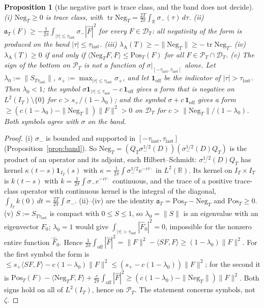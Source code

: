 \documentclass[11pt]{amsart}
\newtheorem{proposition}[theorem]{Proposition}
\theoremstyle{definition}
\theoremstyle{remark}
\newcommand{\R}{\mathbb R}
\newcommand{\PT}{\mathcal P_T}
\newcommand{\IT}{I_T}
\newcommand{\lamA}{\lambda_{\mathrm A}(T)}
\newcommand{\Fh}{\widehat F}
\begin{document}
\begin{proposition}[the negative part is trace class, and the band does not decide]\label{prop:negtrace}
\emph{(i)} $\mathrm{Neg}_T\ge0$ is trace class, with $\operatorname{tr}\mathrm{Neg}_T=\frac{2T}{2\pi}\int_\R\sigma_-(\tau)\,d\tau$.
\emph{(ii)} $\mathfrak a_T(F)\ge-\frac1{2\pi}\int_{|\tau|\le\tau_{\mathrm{last}}}\sigma_-|\Fh|^2$ for every $F\in\mathcal D_T$:
all negativity of the form is produced on the band $|\tau|\le\tau_{\mathrm{last}}$.
\emph{(iii)} $\lamA\ge-\|\mathrm{Neg}_T\|\ge-\operatorname{tr}\mathrm{Neg}_T$.
\emph{(iv)} $\lamA\ge0$ if and only if $\langle\mathrm{Neg}_TF,F\rangle\le\mathrm{Pos}_T(F)$ for all $F\in\PT\cap\mathcal D_T$.
\emph{(v)} The sign of the bottom on $\PT$ is not a function of $\sigma|_{[-\tau_{\mathrm{last}},\tau_{\mathrm{last}}]}$ alone. Let
$\lambda_0:=\|S_{T\tau_{\mathrm{last}}}\|$, $s_+:=\max_{|\tau|\le\tau_{\mathrm{last}}}\sigma_+$, and let $\mathbf 1_{\mathrm{off}}$ be the indicator
of $|\tau|>\tau_{\mathrm{last}}$. Then $\lambda_0<1$; the symbol $\sigma\mathbf 1_{|\tau|\le\tau_{\mathrm{last}}}-c\,\mathbf 1_{\mathrm{off}}$ gives a
form that is negative on $L^2(\IT)\setminus\{0\}$ for $c>s_+/(1-\lambda_0)$; and the symbol
$\sigma+c\,\mathbf 1_{\mathrm{off}}$ gives a form $\ge(c(1-\lambda_0)-\|\mathrm{Neg}_T\|)\|F\|^2>0$ on $\mathcal D_T$ for
$c>\|\mathrm{Neg}_T\|/(1-\lambda_0)$. Both symbols agree with $\sigma$ on the band.
\end{proposition}
\begin{proof}
(i) $\sigma_-$ is bounded and supported in $[-\tau_{\mathrm{last}},\tau_{\mathrm{last}}]$ (Proposition~\ref{prop:band}). So
$\mathrm{Neg}_T=(Q_T\sigma_-^{1/2}(D))(\sigma_-^{1/2}(D)Q_T)$ is the product of an operator and its adjoint, each
Hilbert--Schmidt: $\sigma_-^{1/2}(D)Q_T$ has kernel $\kappa(t-s)\mathbf 1_{\IT}(s)$ with
$\kappa=\frac1{2\pi}\int\sigma_-^{1/2}e^{-i\tau\cdot}$ in $L^2(\R)$. Its kernel on $\IT\times\IT$ is $k(t-s)$ with
$k=\frac1{2\pi}\int\sigma_-e^{-i\tau\cdot}$ continuous, and the trace of a positive trace-class operator with
continuous kernel is the integral of the diagonal, $\int_{\IT}k(0)\,dt=\frac{2T}{2\pi}\int\sigma_-$.
(ii)--(iv) are the identity $\mathfrak a_T=\mathrm{Pos}_T-\mathrm{Neg}_T$ and $\mathrm{Pos}_T\ge0$.
(v) $S:=S_{T\tau_{\mathrm{last}}}$ is compact with $0\le S\le1$, so $\lambda_0=\|S\|$ is an eigenvalue with an
eigenvector $F_0$; $\lambda_0=1$ would give $\int_{|\tau|>\tau_{\mathrm{last}}}|\Fh_0|^2=0$, impossible for the nonzero entire
function $\Fh_0$. Hence $\frac1{2\pi}\int_{\mathrm{off}}|\Fh|^2=\|F\|^2-\langle SF,F\rangle\ge(1-\lambda_0)\|F\|^2$. For the first
symbol the form is $\le s_+\langle SF,F\rangle-c(1-\lambda_0)\|F\|^2\le(s_+-c(1-\lambda_0))\|F\|^2$; for the second it is
$\mathrm{Pos}_T(F)-\langle\mathrm{Neg}_TF,F\rangle+\frac c{2\pi}\int_{\mathrm{off}}|\Fh|^2\ge(c(1-\lambda_0)-\|\mathrm{Neg}_T\|)\|F\|^2$. Both
signs hold on all of $L^2(\IT)$, hence on $\PT$. The statement concerns symbols, not $\zeta$.
\end{proof}
\end{document}
